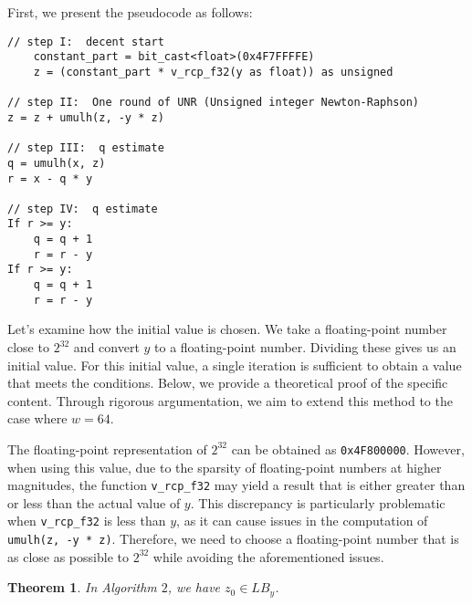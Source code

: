 \documentclass[12pt]{elsarticle}
\newtheorem{theorem}{Theorem}
\begin{document}
First, we present the pseudocode as follows:

\begin{Verbatim}[frame=single, fontsize=\small, label={Algorithm 2: UNR recurrence method for W=32.}]
// step I:  decent start
    constant_part = bit_cast<float>(0x4F7FFFFE)
    z = (constant_part * v_rcp_f32(y as float)) as unsigned

// step II:  One round of UNR (Unsigned integer Newton-Raphson)
z = z + umulh(z, -y * z)

// step III:  q estimate
q = umulh(x, z)
r = x - q * y

// step IV:  q estimate
If r >= y:
    q = q + 1
    r = r - y
If r >= y:
    q = q + 1
    r = r - y
\end{Verbatim}

Let's examine how the initial value is chosen. We take a floating-point number close to $2^{32}$ and convert $y$ to a floating-point number. Dividing these gives us an initial value. For this initial value, a single iteration is sufficient to obtain a value that meets the conditions. Below, we provide a theoretical proof of the specific content. Through rigorous argumentation, we aim to extend this method to the case where $w=64$.

The floating-point representation of \(2^{32}\) can be obtained as \texttt{0x4F800000}. However, when using this value, due to the sparsity of floating-point numbers at higher magnitudes, the function \texttt{v\_rcp\_f32} may yield a result that is either greater than or less than the actual value of \( y \). This discrepancy is particularly problematic when \texttt{v\_rcp\_f32} is less than \( y \), as it can cause issues in the computation of \texttt{umulh(z, -y * z)}. Therefore, we need to choose a floating-point number that is as close as possible to \(2^{32}\) while avoiding the aforementioned issues.

\begin{theorem}\label{thm4}
    In Algorithm $2$, we have $z_0 \in LB_y$.
\end{theorem}
    
\end{document}
